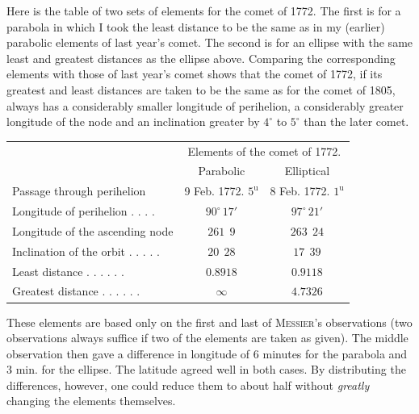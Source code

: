 \par\indent Here is the table of two sets of elements for the comet of 1772. The first is for a parabola in which I took the least distance to be the same as in my (earlier) parabolic elements of last year’s comet. The second is for an ellipse with the same least and greatest distances as the ellipse above. Comparing the corresponding elements with those of last year’s comet shows that the comet of 1772, if its greatest and least distances are taken to be the same as for the comet of 1805, always has a considerably smaller longitude of perihelion, a considerably greater longitude of the node and an inclination greater by $4^\circ$ to $5^\circ$ than the later comet.

\begin{center}\begingroup
\fontsize{8}{10}\selectfont
\setlength{\tabcolsep}{2pt}\renewcommand{\arraystretch}{1.12}
\begin{tabular}{l|c|c}
& \multicolumn{2}{c}{Elements of the comet of 1772.} \\
 & Parabolic & Elliptical \\
\hline
Passage through perihelion & 9 Feb. 1772. $5^{\mathrm{u}}$ & 8 Feb. 1772. $1^{\mathrm{u}}$ \\
Longitude of perihelion . . . . & $90^{\circ}\,17'$ & $97^{\circ}\,21'$ \\
Longitude of the ascending node & $261\ \ 9$ & $263\ \ 24$ \\
Inclination of the orbit . . . . . & $20\ \ 28$ & $17\ \ 39$ \\
Least distance . . . . . . & $0.8918$ & $0.9118$ \\
Greatest distance . . . . . . & $\infty$ & $4.7326$ \\
\end{tabular}\endgroup\end{center}

\par\indent These elements are based only on the first and last of \textsc{Messier}’s observations (two observations always suffice if two of the elements are taken as given). The middle observation then gave a difference in longitude of 6 minutes for the parabola and 3 min. for the ellipse. The latitude agreed well in both cases. By distributing the differences, however, one could reduce them to about half without \emph{greatly} changing the elements themselves.

